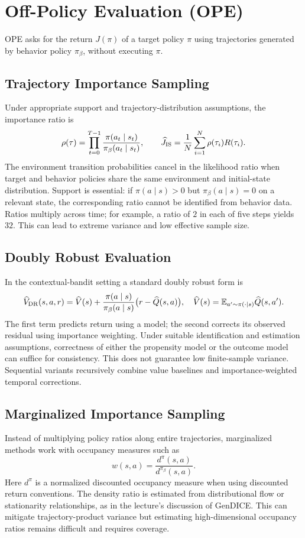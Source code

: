\section{Off-Policy Evaluation (OPE)}
OPE asks for the return $J(\pi)$ of a target policy $\pi$ using trajectories generated by behavior policy $\pi_\beta$, without executing $\pi$.

\subsection{Trajectory Importance Sampling}
Under appropriate support and trajectory-distribution assumptions, the importance ratio is
\[
\rho(\tau)=\prod_{t=0}^{T-1}
\frac{\pi(a_t\mid s_t)}{\pi_\beta(a_t\mid s_t)},
\qquad
\widehat J_{\rm IS}=\frac1N\sum_{i=1}^N \rho(\tau_i)R(\tau_i).
\]
The environment transition probabilities cancel in the likelihood ratio when target and behavior policies share the same environment and initial-state distribution. Support is essential: if $\pi(a\mid s)>0$ but $\pi_\beta(a\mid s)=0$ on a relevant state, the corresponding ratio cannot be identified from behavior data. Ratios multiply across time; for example, a ratio of $2$ in each of five steps yields $32$. This can lead to extreme variance and low effective sample size.

\subsection{Doubly Robust Evaluation}
In the contextual-bandit setting a standard doubly robust form is
\[
\widehat V_{\rm DR}(s,a,r)
=\widehat V(s)+
\frac{\pi(a\mid s)}{\pi_\beta(a\mid s)}
\bigl(r-\widehat Q(s,a)\bigr),
\quad
\widehat V(s)=\mathbb{E}_{a'\sim\pi(\cdot\mid s)}\widehat Q(s,a').
\]
The first term predicts return using a model; the second corrects its observed residual using importance weighting. Under suitable identification and estimation assumptions, correctness of either the propensity model or the outcome model can suffice for consistency. This does not guarantee low finite-sample variance. Sequential variants recursively combine value baselines and importance-weighted temporal corrections.

\subsection{Marginalized Importance Sampling}
Instead of multiplying policy ratios along entire trajectories, marginalized methods work with occupancy measures such as
\[
w(s,a)=\frac{d^\pi(s,a)}{d^{\pi_\beta}(s,a)}.
\]
Here $d^\pi$ is a normalized discounted occupancy measure when using discounted return conventions. The density ratio is estimated from distributional flow or stationarity relationships, as in the lecture's discussion of GenDICE. This can mitigate trajectory-product variance but estimating high-dimensional occupancy ratios remains difficult and requires coverage.

